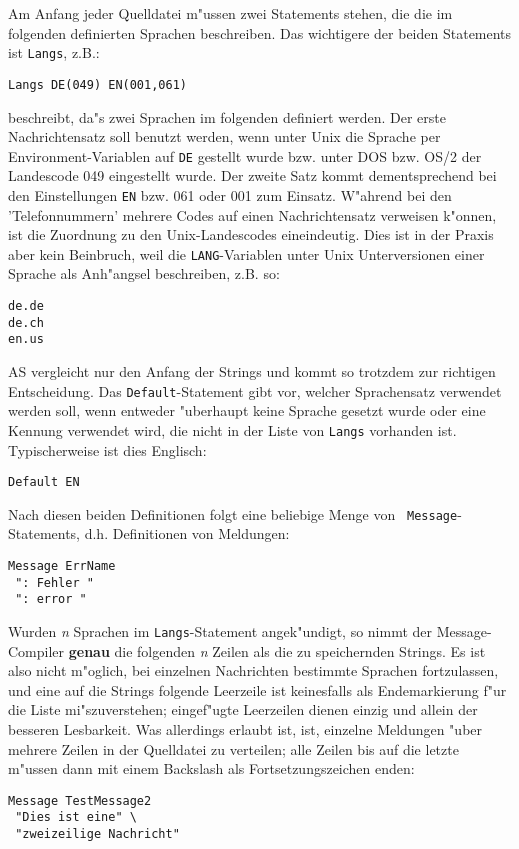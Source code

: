 \documentclass[12pt,a4paper,twoside]{report}
\begin{document}
{Am Anfang jeder Quelldatei m"ussen zwei Statements stehen, die die im
folgenden definierten Sprachen beschreiben.  Das wichtigere der beiden
Statements ist {\tt Langs}, z.B.:
\begin{verbatim}
Langs DE(049) EN(001,061)
\end{verbatim}
beschreibt, da"s zwei Sprachen im folgenden definiert werden.  Der erste
Nachrichtensatz soll benutzt werden, wenn unter Unix die Sprache per
Environment-Variablen auf {\tt DE} gestellt wurde bzw. unter DOS bzw. OS/2
der Landescode 049 eingestellt wurde.  Der zweite Satz kommt
dementsprechend bei den Einstellungen {\tt EN} bzw. 061 oder 001 zum
Einsatz.  W"ahrend bei den 'Telefonnummern' mehrere Codes auf einen
Nachrichtensatz verweisen k"onnen, ist die Zuordnung zu den
Unix-Landescodes eineindeutig.  Dies ist in der Praxis aber kein
Beinbruch, weil die {\tt LANG}-Variablen unter Unix Unterversionen einer
Sprache als Anh"angsel beschreiben, z.B. so:
\begin{verbatim}
de.de
de.ch
en.us
\end{verbatim}
AS vergleicht nur den Anfang der Strings und kommt so trotzdem zur
richtigen Entscheidung.
Das {\tt Default}-Statement gibt vor, welcher Sprachensatz verwendet
werden soll, wenn entweder "uberhaupt keine Sprache gesetzt wurde oder
eine Kennung verwendet wird, die nicht in der Liste von {\tt Langs}
vorhanden ist.  Typischerweise ist dies Englisch:
\begin{verbatim}
Default EN
\end{verbatim}
Nach diesen beiden Definitionen folgt eine beliebige Menge von {\tt
Message}-Statements, d.h. Definitionen von Meldungen:
\begin{verbatim}
Message ErrName
 ": Fehler "
 ": error "
\end{verbatim}
Wurden {\em n} Sprachen im {\tt Langs}-Statement angek"undigt, so nimmt
der Message-Compiler {\bf genau} die folgenden {\em n} Zeilen als die zu
speichernden Strings.  Es ist also nicht m"oglich, bei einzelnen
Nachrichten bestimmte Sprachen fortzulassen, und eine auf die Strings
folgende Leerzeile ist keinesfalls als Endemarkierung f"ur die Liste
mi"szuverstehen; eingef"ugte Leerzeilen dienen einzig und allein der
besseren Lesbarkeit.  Was allerdings erlaubt ist, ist, einzelne Meldungen
"uber mehrere Zeilen in der Quelldatei zu verteilen; alle Zeilen bis auf
die letzte m"ussen dann mit einem Backslash als Fortsetzungszeichen enden:
\begin{verbatim}
Message TestMessage2
 "Dies ist eine" \  
 "zweizeilige Nachricht"

\end{verbatim}}
\end{document}
